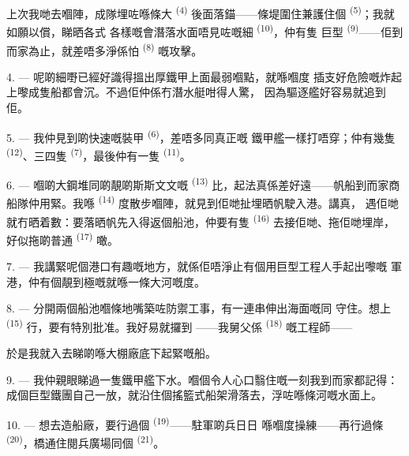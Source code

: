 上次我哋去嗰陣，成隊埋咗喺條大 \textsuperscript{(4)}
後面落錨——條堤圍住兼護住個 \textsuperscript{(5)}；我就如願以償，睇晒各式
各樣嘅會潛落水面唔見咗嘅細 \textsuperscript{(10)}，仲有隻
巨型 \textsuperscript{(9)}——佢到而家為止，就差唔多淨係怕
\textsuperscript{(8)} 嘅攻擊。

\VUsaut{3.0mm}
\VUsaut{3.0mm}

4. --- 呢啲細嘢已經好識得搵出厚鐵甲上面最弱嗰點，就喺嗰度
插支好危險嘅炸起上嚟成隻船都會沉。不過佢仲係冇潛水艇咁得人驚，
因為驅逐艦好容易就追到佢。

5. --- 我仲見到啲快速嘅裝甲 \textsuperscript{(6)}，差唔多同真正嘅
鐵甲艦一樣打唔穿；仲有幾隻 \textsuperscript{(12)}、三四隻
\textsuperscript{(7)}，最後仲有一隻 \textsuperscript{(11)}。

6. --- 嗰啲大鋼堆同啲靚啲斯斯文文嘅
\textsuperscript{(13)} 比，起法真係差好遠——帆船到而家商船隊仲用緊。我喺
 \textsuperscript{(14)} 度散步嗰陣，就見到佢哋扯埋晒帆駛入港。講真，
遇佢哋就冇晒着數：要落晒帆先入得返個船池，仲要有隻
 \textsuperscript{(16)} 去接佢哋、拖佢哋埋岸，好似拖啲普通
\textsuperscript{(17)} 噉。

\VUsaut{3.0mm}
\VUsaut{3.0mm}

7. --- 我講緊呢個港口有趣嘅地方，就係佢唔淨止有個用巨型工程人手起出嚟嘅
軍港，仲有個靚到極嘅就喺一條大河嘅度。

8. --- 分開兩個船池嗰條地嘴築咗防禦工事，有一連串伸出海面嘅同
守住。想上 \textsuperscript{(15)} 行，要有特別批准。我好易就攞到
——我舅父係 \textsuperscript{(18)} 嘅工程師——

於是我就入去睇啲喺大棚廠底下起緊嘅船。

9. --- 我仲親眼睇過一隻鐵甲艦下水。嗰個令人心口翳住嘅一刻我到而家都記得：
成個巨型鐵團自己一放，就沿住個搖籃式船架滑落去，浮咗喺條河嘅水面上。

10. --- 想去造船廠，要行過個 \textsuperscript{(19)}——駐軍啲兵日日
喺嗰度操練——再行過條 \textsuperscript{(20)}，橋通住閱兵廣場同個
 \textsuperscript{(21)}。

